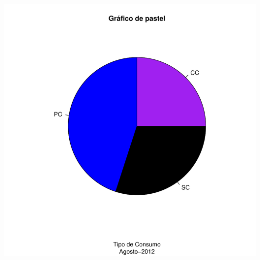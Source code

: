 \documentclass[10pt,a4paper]{article}\usepackage[]{graphicx}\usepackage[]{color}
\makeatletter
\def\maxwidth{ %
  \ifdim\Gin@nat@width>\linewidth
    \linewidth
  \else
    \Gin@nat@width
  \fi
}
\newenvironment{knitrout}{}{} %
\makeatother
\begin{document}
\begin{knitrout}
\includegraphics[width=\maxwidth]{figure/unnamed-chunk-1-3} 

\end{knitrout}
\end{document}
